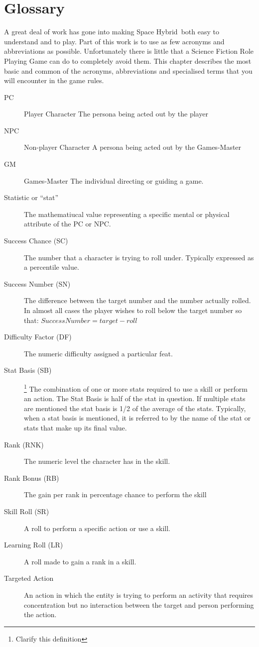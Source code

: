 \chapter{Glossary}

A great deal of work has gone into making Space Hybrid\ both
easy to understand and to play. Part of this work is to use as few 
acronyms and abbreviations as possible. Unfortunately there is little
that a Science Fiction Role Playing Game can do to completely avoid 
them. This chapter describes the most basic 
and common of the acronyms, abbreviations and specialised 
terms that you will encounter in the game rules. 

\begin{description}
	\item[PC] Player Character 
    The persona being acted out by the player
    \item[NPC] Non-player Character
    A persona being acted out by the Games-Master
    \item[GM] Games-Master
    The individual directing or guiding a game.
    \item[Statistic or ``stat'']
    The mathematiucal value representing a specific mental or 
	physical attribute of the PC or NPC.
	\item[Success Chance (SC)] 
	The number that a character is trying to roll under. 
	Typically expressed as a percentile value.
	\item[Success Number (SN)] 
	The difference between the target number and the number actually rolled. In
	almost all cases the player wishes to roll below the target number so that:
	\(Success Number = target - roll\)
	\item[Difficulty Factor (DF)] 
	The numeric difficulty assigned a particular feat.
	\item[Stat Basis (SB)] \footnote{Clarify this definition}
	The combination of one or more stats required to use a skill or perform an
    action. The Stat Basis is half of the stat in question. If 
	multiple stats are mentioned the stat basis is 1/2 of the average 
	of the stats. Typically, when a stat basis is mentioned, it is referred 
	to by the name of the stat or stats that make up its final value.
	\item[Rank (RNK)] 
	The numeric level the character has in the skill.
	\item[Rank Bonus (RB)]
	The gain per rank in percentage chance to perform the skill
	\item[Skill Roll (SR)]
	A roll to perform a specific action or use a skill.
	\item[Learning Roll (LR)]
	A roll made to gain a rank in a skill.
	\item[Targeted Action] 
	An action in which the entity is trying to perform an activity 
	that requires concentration but no interaction between the target 
	and person performing the action.
\end{description}


